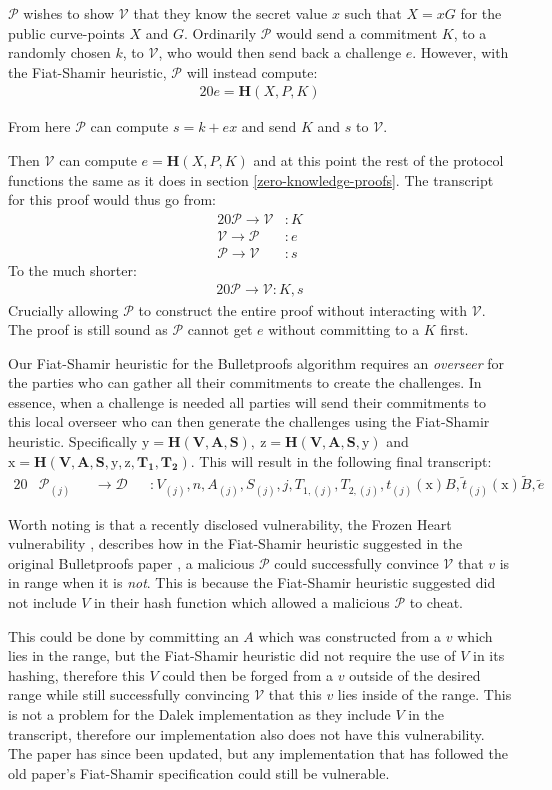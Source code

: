 \documentclass{article}
\newcommand{\eq}[1]{\begin{alignat*}{20}#1\end{alignat*}}
\renewcommand{\vec}[1]{\boldsymbol{#1}}
\newcommand{\ran}[1]{\mathrm{#1}}
\newcommand{\V}{\mathcal{V}}
\renewcommand{\P}{\mathcal{P}}
\newcommand{\D}{\mathcal{D}}
\newcommand{\blind}[1]{\widetilde{#1}}
\newcommand{\bt}{\blind{t}}
\newcommand{\bB}{\blind{B}}
\newcommand{\be}{\blind{e}}
\begin{document}
$\P$ wishes to show $\V$ that they know the secret value $x$ such that
$X = xG$ for the public curve-points $X$ and $G$. Ordinarily $\P$ would
send a commitment $K$, to a randomly chosen $k$, to $\V$, who would
then send back a challenge $e$. However, with the Fiat-Shamir heuristic,
$\P$ will instead compute:
\eq{
	e = \textbf{H}(X,P,K)
}

From here $\P$ can compute $s = k + ex$ and send $K$ and $s$ to $\V$.

Then $\V$ can compute $e = \textbf{H}(X,P,K)$ and at this point
the rest of the protocol functions the same as it does in section
\ref{zero-knowledge-proofs}. The transcript for this proof would thus
go from:
\eq{
	\P \rightarrow \V &: K \\
	\V \rightarrow \P &: e \\
	\P \rightarrow \V &: s
}
To the much shorter:
\eq{
	\P \rightarrow \V: K, s
}
Crucially allowing $\P$ to construct the entire proof without
interacting with $\V$. The proof is still sound as $\P$ cannot get $e$
without committing to a $K$ first.

Our Fiat-Shamir heuristic for the Bulletproofs algorithm requires
an \textit{overseer} for the parties who can gather all their
commitments to create the challenges. In essence, when a challenge
is needed all parties will send their commitments to this local
overseer who can then generate the challenges using the Fiat-Shamir
heuristic. Specifically $\ran{y} = \textbf{H}(\vec{V},\vec{A},\vec{S}),
\ \ran{z} = \textbf{H}(\vec{V},\vec{A},\vec{S}, \ran{y})$ and
$\ran{x} = \textbf{H}(\vec{V},\vec{A},\vec{S}, \ran{y}, \ran{z},
\vec{T_1},\vec{T_2})$. This will result in the following final
transcript:
\eq{
	&\P_{(j)} &&\rightarrow \D &&: V_{(j)}, n, A_{(j)}, S_{(j)}, j, T_{1, (j)}, T_{2,(j)}, t_{(j)}(\ran{x})B, \bt_{(j)}(\ran{x})\bB, \be
}

Worth noting is that a recently disclosed vulnerability, the Frozen
Heart vulnerability \cite{frozen-heart}, describes how in the
Fiat-Shamir heuristic suggested in the original Bulletproofs paper
\cite{bulletproofs}, a malicious $\P$ could successfully convince $\V$
that $v$ is in range when it is \textit{not}. This is because the
Fiat-Shamir heuristic suggested did not include $V$ in their hash
function which allowed a malicious $\P$ to cheat.

This could be done by committing an $A$ which was constructed from
a $v$ which lies in the range, but the Fiat-Shamir heuristic did
not require the use of $V$ in its hashing, therefore this $V$
could then be forged from a $v$ outside of the desired range while
still successfully convincing $\V$ that this $v$ lies inside of the
range. This is not a problem for the Dalek implementation as they
include $V$ in the transcript, therefore our implementation also
does not have this vulnerability. The paper has since been updated,
but any implementation that has followed the old paper's Fiat-Shamir
specification could still be vulnerable.
\end{document}
